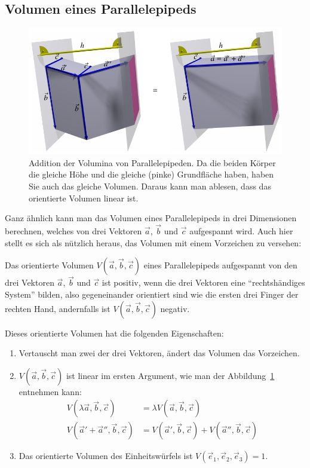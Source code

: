 \subsection{Volumen eines Parallelepipeds}
\begin{figure}
\begin{center}
\includegraphics{5/images/volumen.pdf}
\end{center}
\caption{Addition der Volumina von Parallelepipeden.
Da die beiden Körper die gleiche Höhe und die gleiche (pinke) Grundfläche
haben, haben Sie auch das gleiche Volumen.
Daraus kann man ablesen, dass das orientierte Volumen linear ist.
\label{image-volumina}}
\end{figure}
Ganz ähnlich kann man das Volumen eines Parallelepipeds in drei Dimensionen
berechnen, welches von drei Vektoren $\vec a$, $\vec b$ und $\vec c$
aufgespannt wird.
Auch hier stellt es sich als nützlich heraus,
das Volumen mit einem Vorzeichen zu versehen:
\begin{definition}
Das orientierte Volumen
$V(\vec a,\vec b,\vec c)$
eines Parallelepipeds aufgespannt von den drei
Vektoren
$\vec a$, $\vec b$ und $\vec c$ ist positiv, wenn die drei Vektoren
eine ``rechtshändiges System'' bilden, also gegeneinander orientiert
sind wie die ersten drei Finger der rechten Hand, andernfalls ist
$V(\vec a,\vec b,\vec c)$ negativ.
\end{definition}
Dieses orientierte Volumen hat die folgenden Eigenschaften:
\begin{enumerate}
\item Vertauscht man zwei der drei Vektoren, ändert das Volumen das Vorzeichen.
\item $V(\vec a,\vec b,\vec c)$ ist linear im ersten Argument, wie man
der Abbildung~\ref{image-volumina} entnehmen kann:
\begin{align*}
V(\lambda\vec a,\vec b,\vec c)
&=
\lambda V(\vec a,\vec b,\vec c)
\\
V(\vec a'+\vec a'',\vec b,\vec c)
&=
V(\vec a',\vec b,\vec c)
+
V(\vec a'',\vec b,\vec c)
\end{align*}
\item Das orientierte Volumen des Einheitswürfels ist
$V(\vec e_1,\vec e_2,\vec e_3)=1$.
\end{enumerate}
